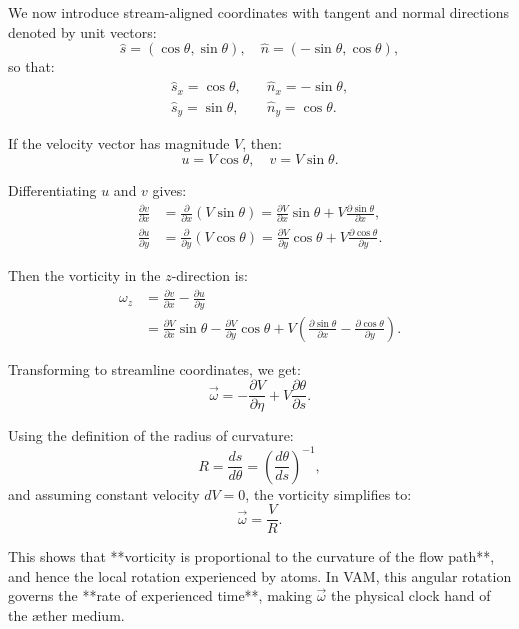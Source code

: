 \documentclass[12pt]{article}
\begin{document}
    We now introduce stream-aligned coordinates with tangent and normal directions denoted by unit vectors:
    \[
        \hat{s} = (\cos \theta, \sin \theta), \quad
        \hat{n} = (-\sin \theta, \cos \theta),
    \]
    so that:
    \begin{align}
        \hat{s}_x = \cos \theta, &\quad \hat{n}_x = -\sin \theta, \\
        \hat{s}_y = \sin \theta, &\quad \hat{n}_y = \cos \theta.
    \end{align}

    If the velocity vector has magnitude \(V\), then:
    \begin{equation}
        u = V \cos \theta, \quad
        v = V \sin \theta.
    \end{equation}

    Differentiating \(u\) and \(v\) gives:
    \begin{align}
        \frac{\partial v}{\partial x} &= \frac{\partial}{\partial x} (V \sin \theta) = \frac{\partial V}{\partial x} \sin \theta + V \frac{\partial \sin \theta}{\partial x}, \\
        \frac{\partial u}{\partial y} &= \frac{\partial}{\partial y} (V \cos \theta) = \frac{\partial V}{\partial y} \cos \theta + V \frac{\partial \cos \theta}{\partial y}.
    \end{align}

    Then the vorticity in the \(z\)-direction is:
    \begin{align}
        \omega_z &= \frac{\partial v}{\partial x} - \frac{\partial u}{\partial y} \\
        &= \frac{\partial V}{\partial x} \sin \theta - \frac{\partial V}{\partial y} \cos \theta
        + V \left( \frac{\partial \sin \theta}{\partial x} - \frac{\partial \cos \theta}{\partial y} \right).
    \end{align}

    Transforming to streamline coordinates, we get:
    \begin{equation}
        \vec{\omega} = -\frac{\partial V}{\partial \eta} + V \frac{\partial \theta}{\partial s}.
    \end{equation}

    Using the definition of the radius of curvature:
    \begin{equation}
        R = \frac{ds}{d\theta} = \left( \frac{d\theta}{ds} \right)^{-1},
    \end{equation}
    and assuming constant velocity \(dV = 0\), the vorticity simplifies to:
    \begin{equation}
        \boxed{\vec{\omega} = \frac{V}{R}}.
    \end{equation}

    This shows that **vorticity is proportional to the curvature of the flow path**, and hence the local rotation experienced by atoms. In VAM, this angular rotation governs the **rate of experienced time**, making \(\vec{\omega}\) the physical clock hand of the æther medium.


\ifdefined\standalonechapter
\else


\end{document}
